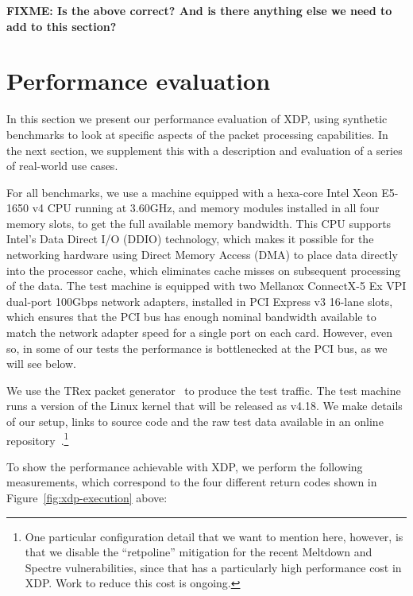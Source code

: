 \documentclass[10pt,sigconf]{acmart}
\begin{document}
\textbf{FIXME: Is the above correct? And is there anything else we need to add
  to this section?}

\section{Performance evaluation}
\label{sec:perf-eval}
In this section we present our performance evaluation of XDP, using synthetic
benchmarks to look at specific aspects of the packet processing capabilities. In
the next section, we supplement this with a description and evaluation of a
series of real-world use cases.

For all benchmarks, we use a machine equipped with a hexa-core Intel Xeon
E5-1650 v4 CPU running at 3.60GHz, and memory modules installed in all four
memory slots, to get the full available memory bandwidth. This CPU supports
Intel's Data Direct I/O (DDIO) technology, which makes it possible for the
networking hardware using Direct Memory Access (DMA) to place data directly into
the processor cache, which eliminates cache misses on subsequent processing of
the data. The test machine is equipped with two Mellanox ConnectX-5 Ex VPI
dual-port 100Gbps network adapters, installed in PCI Express v3 16-lane slots,
which ensures that the PCI bus has enough nominal bandwidth available to match
the network adapter speed for a single port on each card. However, even so, in
some of our tests the performance is bottlenecked at the PCI bus, as we will see
below.

We use the TRex packet generator~\cite{cisco18:_trex_traff_gener} to produce the
test traffic. The test machine runs a version of the Linux kernel that will
be released as v4.18. We make details of our setup, links to source code and the
raw test data available in an online repository~\cite{test-data}.\footnote{One
  particular configuration detail that we want to mention here, however, is that
  we disable the ``retpoline'' mitigation for the recent Meltdown and Spectre
  vulnerabilities, since that has a particularly high performance cost in XDP.
  Work to reduce this cost is ongoing.}

To show the performance achievable with XDP, we perform the following
measurements, which correspond to the four different return codes shown in
Figure~\ref{fig:xdp-execution} above:
\end{document}
